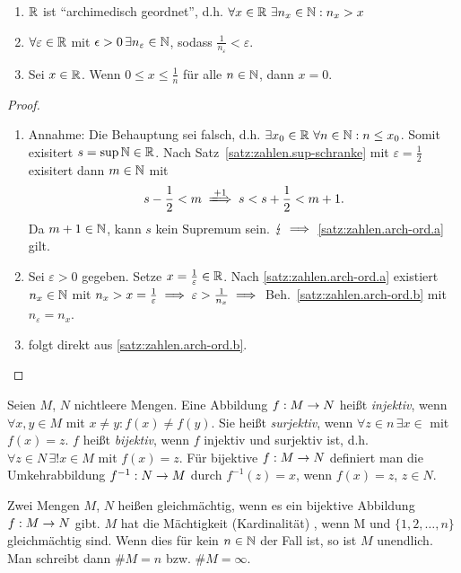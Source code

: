 \documentclass[12pt]{scrreprt}
\begin{document}
\begin{satz}\label{satz:zahlen.arch-ord}
\begin{enumerate}
\item \label{satz:zahlen.arch-ord.a}
$\mathbb{R}$ ist "`archimedisch geordnet"', d.h. $\forall x \in \mathbb{R}\,\, \exists n_x \in \mathbb{N} : n_x > x$
\item \label{satz:zahlen.arch-ord.b}
$\forall \varepsilon \in \mathbb{R}$ mit $\epsilon > 0\,\exists n_\varepsilon \in \mathbb{N}$, sodass $\displaystyle\frac{1}{n_\varepsilon} < \varepsilon$.
\item \label{satz:zahlen.arch-ord.c}
Sei $x \in \mathbb{R}$. Wenn $\displaystyle 0 \le x \le \frac{1}{n} $ für alle $ n \in \mathbb{N}$, dann $x = 0$.
\end{enumerate}
\end{satz}
\begin{proof}
\begin{enumerate}
\item Annahme: Die Behauptung sei falsch, d.h. $\exists x_0 \in \mathbb{R}\ \forall n \in \mathbb{N} : n \le x_0$.
Somit exisitert $s = \sup \mathbb{N} \in \mathbb{R}$. Nach Satz~\ref{satz:zahlen.sup-schranke} mit $\varepsilon = \frac{1}{2}$
exisitert dann $m\in \mathbb{N}$ mit
\[s-\frac{1}{2} < m \folgtwegen{+1} s < s+\frac{1}{2} < m +1.\]
Da $m+1 \in \mathbb{N}$, kann $s$ kein Supremum
sein. $\lightning \implies$ \ref{satz:zahlen.arch-ord.a} gilt.
\item Sei $\varepsilon > 0$ gegeben. Setze $x = \frac{1}{\varepsilon} \in \mathbb{R}$. Nach \ref{satz:zahlen.arch-ord.a} existiert $n_x \in \mathbb{N}$
mit $n_x > x = \frac{1}{\varepsilon} \implies \varepsilon > \frac{1}{n_x} \implies$ Beh.~\ref{satz:zahlen.arch-ord.b} mit $n_\varepsilon = n_x$.
\item folgt direkt aus \ref{satz:zahlen.arch-ord.b}.
\end{enumerate}
\end{proof}

\begin{dfn*}
Seien $M$, $N$ nichtleere Mengen. Eine Abbildung $f: M \rightarrow N$ heißt \emph{injektiv}, wenn $\forall x,y \in M$ mit $x \ne y : f(x) \ne f(y)$.
Sie heißt \emph{surjektiv}, wenn $\forall z \in n\,\exists x\in $ mit $f(x)=z$.
$f$ heißt \emph{bijektiv}, wenn $f$ injektiv und surjektiv ist, d.h. $\forall z \in N\, \exists !x\in M$ mit $f(x)=z$.
Für bijektive $f: M \rightarrow N$ definiert man die Umkehrabbildung $f^{-1} : N \rightarrow M$ durch $f^{-1}(z) = x$, wenn $f(x) = z$, $z\in N$.
\end{dfn*}
\begin{dfn}\label{dfn:zahlen.maechtigigkeit}
Zwei Mengen $M$, $N$ heißen gleichmächtig, wenn es ein bijektive Abbildung $f: M \rightarrow N$ gibt. $M$ hat die Mächtigkeit
(Kardinalität) , wenn M und $\{1,2, \dotsc , n\}$ gleichmächtig sind. Wenn dies für kein $n \in \mathbb{N}$ der Fall ist,
so ist $M$ unendlich. Man schreibt dann $\#M = n$ bzw. $\#M = \infty$.
\end{dfn}
\end{document}
